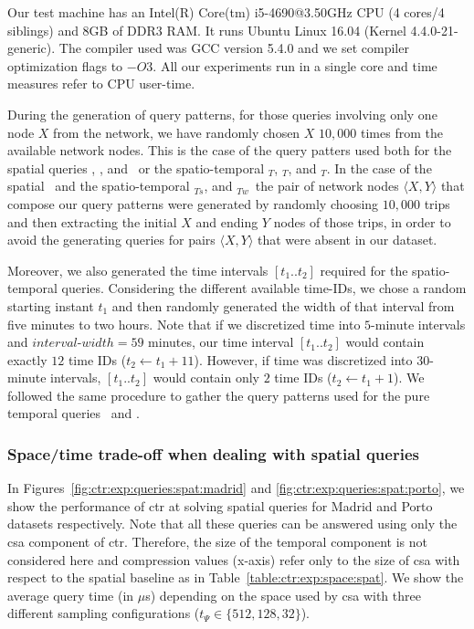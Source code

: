 	Our test machine has an Intel(R) Core(tm) i5-4690@3.50GHz CPU (4 cores/4 siblings) and 8GB of DDR3 RAM. 
	It runs Ubuntu Linux 16.04 (Kernel 4.4.0-21-generic). The compiler used was GCC version 5.4.0 and we set compiler optimization flags to $-O3$. All our experiments run in a single core and time measures refer to CPU user-time.

	During the generation of query patterns, for those queries involving only one node $X$ from the network, 
	we have randomly chosen $X$ $10,\!000$ times from the available network nodes. 
	This is the case of the query patters used both for
	the spatial queries \startX, \endX, and \loadX\ or the spatio-temporal \startX$_T$, \endX$_T$, and \loadX$_T$.
	In the case of the spatial \XtoY\ and the spatio-temporal \XtoY$_{Ts}$, and \XtoY$_{Tw}$\ the pair of
	network nodes $\langle X,Y \rangle$ that compose our
	query patterns were generated by randomly choosing
	$10,\!000$ trips and then extracting the initial $X$ and ending $Y$ nodes of those trips, in order to avoid the generating queries for pairs $\langle X,Y \rangle$ that were absent in our dataset.

	Moreover, we also generated the time intervals $[t_1..t_2]$ required for 
	the spatio-temporal queries. Considering the different available time-IDs, we chose a random starting
	instant $t_1$ and then randomly generated the width of that interval from five minutes to two hours.
	Note that if we discretized time into $5$-minute intervals and $interval$-$width=59$ minutes, our time
	interval $[t_1..t_2]$ would contain exactly $12$ time IDs ($t_2\leftarrow t_1+11$). However, if time was
	discretized into $30$-minute intervals, $[t_1..t_2]$ would contain only $2$ time IDs ($t_2\leftarrow t_1+1$).
	We followed the same procedure to gather the query patterns used for the pure temporal queries \loadT\ and \startT.

	\subsubsection{Space/time trade-off when dealing with spatial queries} \label{sec:ctr:exp:queries:spat}

	In Figures~\ref{fig:ctr:exp:queries:spat:madrid} and \ref{fig:ctr:exp:queries:spat:porto}, we show the performance of \gls{ctr} at
	solving spatial queries for Madrid and Porto datasets respectively. 
	Note that all these queries can be answered using only the \gls{csa} component
	of \gls{ctr}. Therefore, the size of the temporal component 
	is not considered here and compression values (x-axis) refer only to the size of \gls{csa} with
	respect to the spatial baseline as in Table~\ref{table:ctr:exp:space:spat}. 
	We show the average query time (in $\mu$s) depending on the
	space used by \gls{csa} with three different 
	sampling configurations ($t_{\Psi} \in \{512, 128, 32\}$).

